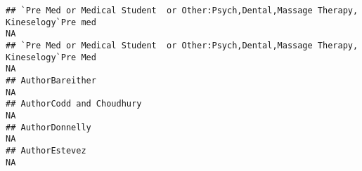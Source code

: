\documentclass[]{article}
\begin{document}
\begin{verbatim}
## `Pre Med or Medical Student  or Other:Psych,Dental,Massage Therapy, Kineselogy`Pre med                                                                                                                                                                                                                                                                                                                                                                                                NA
## `Pre Med or Medical Student  or Other:Psych,Dental,Massage Therapy, Kineselogy`Pre Med                                                                                                                                                                                                                                                                                                                                                                                                NA
## AuthorBareither                                                                                                                                                                                                                                                                                                                                                                                                                                                                       NA
## AuthorCodd and Choudhury                                                                                                                                                                                                                                                                                                                                                                                                                                                              NA
## AuthorDonnelly                                                                                                                                                                                                                                                                                                                                                                                                                                                                        NA
## AuthorEstevez                                                                                                                                                                                                                                                                                                                                                                                                                                                                         NA

\end{verbatim}
\end{document}
